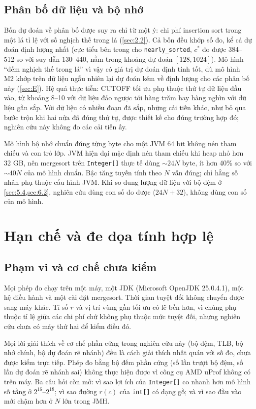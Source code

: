 \documentclass[12pt,a4paper]{article}
\begin{document}
\subsection{Phân bố dữ liệu và bộ nhớ}\label{sec:6.5}\label{sec:6.7}
Bốn dự đoán về phân bố được suy ra chỉ từ một ý: chi phí insertion sort trong một lá tỉ lệ với số nghịch thế trong lá (\cref{sec:2.2}). Cả bốn đều khớp số đo, kể cả dự đoán định lượng nhất (cực tiểu bên trong cho \texttt{nearly\_sorted}, $c^*$ đo được 384--512 so với suy dẫn 130--440, nằm trong khoảng dự đoán $[128, 1024]$). Mô hình ``đếm nghịch thế trong lá'' vì vậy có giá trị dự đoán định tính tốt, dù mô hình M2 khớp trên dữ liệu ngẫu nhiên lại dự đoán kém về định lượng cho các phân bố này (\cref{sec:E}). Hệ quả thực tiễn: CUTOFF tối ưu phụ thuộc thứ tự dữ liệu đầu vào, từ khoảng 8--10 với dữ liệu đảo ngược tới hàng trăm hay hàng nghìn với dữ liệu gần sắp. Với dữ liệu có nhiều đoạn đã sắp, những cải tiến khác, như bỏ qua bước trộn khi hai nửa đã đúng thứ tự, được thiết kế cho đúng trường hợp đó; nghiên cứu này không đo các cải tiến ấy.

Mô hình bộ nhớ chuẩn đúng từng byte cho một JVM 64 bit không nén tham chiếu và con trỏ lớp. JVM hiện đại mặc định nén tham chiếu khi heap nhỏ hơn 32 GB, nên mergesort trên \texttt{Integer[]} thực tế dùng $\sim 24N$ byte, ít hơn 40\% so với $\sim 40N$ của mô hình chuẩn. Bậc tăng tuyến tính theo $N$ vẫn đúng; chỉ hằng số nhân phụ thuộc cấu hình JVM. Khi so dung lượng dữ liệu với bộ đệm ở \cref{sec:5.4,sec:6.2}, nghiên cứu dùng con số đo được ($24N + 32$), không dùng con số của mô hình.

\section{Hạn chế và đe dọa tính hợp lệ}\label{sec:7}
\subsection{Phạm vi và cơ chế chưa kiểm}\label{sec:7.1}\label{sec:7.7}
Mọi phép đo chạy trên một máy, một JDK (Microsoft OpenJDK 25.0.4.1), một hệ điều hành và một cài đặt mergesort. Thời gian tuyệt đối không chuyển được sang máy khác. Tỉ số $r$ và vị trí vùng gần tối ưu có lẽ bền hơn, vì chúng phụ thuộc tỉ lệ giữa các chi phí chứ không phụ thuộc mức tuyệt đối, nhưng nghiên cứu chưa có máy thứ hai để kiểm điều đó.

Mọi lời giải thích về cơ chế phần cứng trong nghiên cứu này (bộ đệm, TLB, bộ nhớ chính, bộ dự đoán rẽ nhánh) đều là cách giải thích nhất quán với số đo, chưa được kiểm trực tiếp. Phép đo bằng bộ đếm phần cứng (số lần trượt bộ đệm, số lần dự đoán rẽ nhánh sai) không thực hiện được vì công cụ AMD uProf không có trên máy. Ba câu hỏi còn mở: vì sao lợi ích của \texttt{Integer[]} co nhanh hơn mô hình số tầng ở $2^{16}$--$2^{18}$; vì sao đường $r(c)$ của \texttt{int[]} có dạng gồ; và vì sao đầu vào mới chậm hơn ở $N$ lớn trong JMH.
\end{document}
